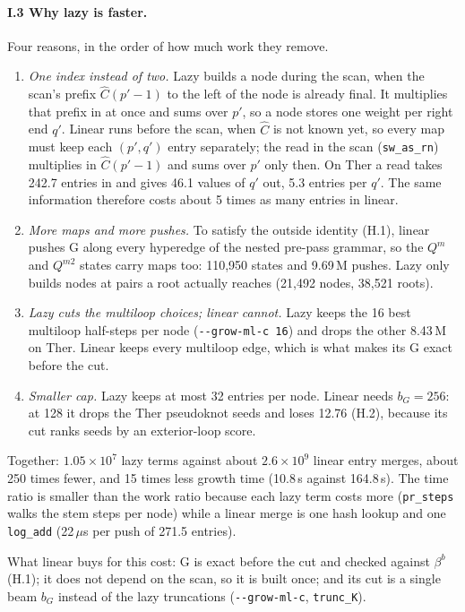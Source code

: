 \documentclass[11pt]{article}
\begin{document}
\paragraph{I.3 Why lazy is faster.} Four reasons, in the order of how much work they remove.
\begin{enumerate}[leftmargin=*]
  \item \emph{One index instead of two.} Lazy builds a node during the scan, when the scan's prefix $\hat C(p'-1)$ to the left of the node is already final. It multiplies that prefix in at once and sums over $p'$, so a node stores one weight per right end $q'$. Linear runs before the scan, when $\hat C$ is not known yet, so every map must keep each $(p',q')$ entry separately; the read in the scan (\texttt{sw\_as\_rn}) multiplies in $\hat C(p'-1)$ and sums over $p'$ only then. On Ther a read takes 242.7 entries in and gives 46.1 values of $q'$ out, 5.3 entries per $q'$. The same information therefore costs about 5 times as many entries in linear.
  \item \emph{More maps and more pushes.} To satisfy the outside identity (H.1), linear pushes G along every hyperedge of the nested pre-pass grammar, so the $Q^m$ and $Q^{m2}$ states carry maps too: 110{,}950 states and 9.69\,M pushes. Lazy only builds nodes at pairs a root actually reaches (21{,}492 nodes, 38{,}521 roots).
  \item \emph{Lazy cuts the multiloop choices; linear cannot.} Lazy keeps the 16 best multiloop half-steps per node (\texttt{-{}-grow-ml-c 16}) and drops the other 8.43\,M on Ther. Linear keeps every multiloop edge, which is what makes its G exact before the cut.
  \item \emph{Smaller cap.} Lazy keeps at most 32 entries per node. Linear needs $b_G=256$: at 128 it drops the Ther pseudoknot seeds and loses 12.76 (H.2), because its cut ranks seeds by an exterior-loop score.
\end{enumerate}
Together: $1.05\times10^{7}$ lazy terms against about $2.6\times10^{9}$ linear entry merges, about 250 times fewer, and 15 times less growth time (10.8\,s against 164.8\,s). The time ratio is smaller than the work ratio because each lazy term costs more (\texttt{pr\_steps} walks the stem steps per node) while a linear merge is one hash lookup and one \texttt{log\_add} (22\,$\mu$s per push of 271.5 entries).

What linear buys for this cost: G is exact before the cut and checked against $\beta^b$ (H.1); it does not depend on the scan, so it is built once; and its cut is a single beam $b_G$ instead of the lazy truncations (\texttt{-{}-grow-ml-c}, \texttt{trunc\_K}).
\end{document}

